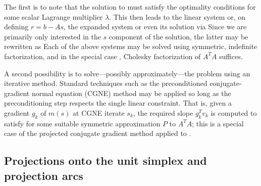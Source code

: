 \documentclass[12pt,twoside]{article}
\begin{document}
The first is to note that the solution
to  must satisfy the optimality conditions
for some scalar Lagrange multiplier $\lambda$. This then leads to the
linear system
or, on defining $r = b - A s$, the expanded system
or even its solution via
Since we are primarily only interested in the $s$ component of the
solution, the latter may be rewritten as
Each of the above systems may be solved using symmetric, indefinite
factorization, and in the special case , Cholesky factorization
of $A^T A$ suffices.

A second possibility is to solve---possibly approximately---the problem
using an iterative method. Standard techniques such as the preconditioned
conjugate-gradient normal equation (CGNE) method may be applied so long
as the preconditioning step respects the single linear constraint. That is,
given a gradient $g_k$ of $m(s)$ at CGNE iterate $s_k$, the required slope
$g_k^T v_k$ is computed to satisfy
for some suitable symmetric approximation $P$ to $A^T A$; this is a
special case of the projected conjugate gradient method
\cite{GoulHribNoce01:sisc} applied to .

\subsection{Projections onto the unit simplex and projection arcs}
\end{document}
